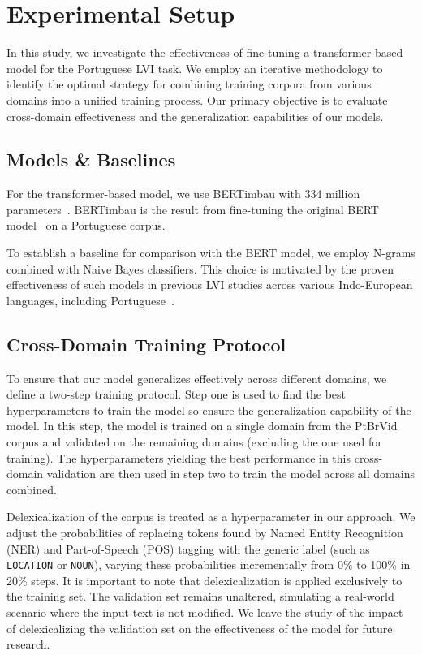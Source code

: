 \section{Experimental Setup}
\label{sec:setup}

In this study, we investigate the effectiveness of fine-tuning a transformer-based model for the Portuguese LVI task. We employ an iterative methodology to identify the optimal strategy for combining training corpora from various domains into a unified training process. Our primary objective is to evaluate cross-domain effectiveness and the generalization capabilities of our models.

\subsection{Models \& Baselines}

For the transformer-based model, we use BERTimbau with 334 million parameters~\cite{souza2020bertimbau}. BERTimbau is the result from fine-tuning the original BERT model~\cite{devlin2019bertpretrainingdeepbidirectional} on a Portuguese corpus.

To establish a baseline for comparison with the BERT model, we employ N-grams combined with Naive Bayes classifiers. This choice is motivated by the proven effectiveness of such models in previous LVI studies across various Indo-European languages, including Portuguese~\cite{zampieri2012automatic}.


\subsection{Cross-Domain Training Protocol}
To ensure that our model generalizes effectively across different domains, we define a two-step training protocol. Step one is used to find the best hyperparameters to train the model so ensure the generalization capability of the model. In this step,  the model is trained on a single domain from the PtBrVid corpus and validated on the remaining domains (excluding the one used for training). The hyperparameters yielding the best performance in this cross-domain validation are then used in step two to train the model across all domains combined.

Delexicalization of the corpus is treated as a hyperparameter in our approach. We adjust the probabilities of replacing tokens found by Named Entity Recognition (NER) and Part-of-Speech (POS) tagging with the generic label (such as \texttt{LOCATION} or \texttt{NOUN}), varying these probabilities incrementally from 0\% to 100\% in 20\% steps. It is important to note that delexicalization is applied exclusively to the training set. The validation set remains unaltered, simulating a real-world scenario where the input text is not modified. We leave the study of the impact of delexicalizing the validation set on the effectiveness of the model for future research.


